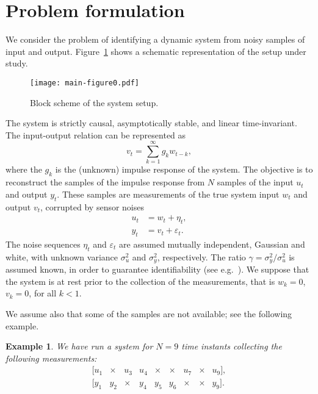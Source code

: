 \documentclass[10pt]{article}
\newtheorem{example}{Example}
\begin{document}
\section{Problem formulation}\label{sec:formulation}
We consider the problem of identifying a dynamic system
from noisy samples of input and output. Figure~\ref{fig:block_scheme} shows a
schematic representation of the setup under study.
\begin{figure}[htb]
  \centering
  \texttt{[image: main-figure0.pdf]}
  \caption{Block scheme of the system setup.}\label{fig:block_scheme}
\end{figure}
The system is strictly causal, asymptotically stable, and linear
time-invariant. The input-output relation can be represented as
\begin{equation}\label{eq:convolution}
  v_t = \sum_{k =1}^\infty g_k  w_{t-k},
\end{equation}
where the $g_k$ is the (unknown) impulse response
of the system. The objective is to reconstruct
the samples of the impulse response from $N$ samples of
the input $u_t$ and output $y_t$. These samples
are measurements of the true system input $w_t$ and output $v_t$, corrupted by
sensor noises
\begin{equation}\label{eq:measurements}
  \begin{split}
    u_t &= w_t + \eta_t,\\
    y_t &= v_t + \varepsilon_t.
  \end{split}
\end{equation}
The noise sequences $\eta_t$ and $\varepsilon_t$ are assumed mutually
independent, Gaussian and white, with unknown variance $\sigma_u^2$ and
$\sigma_y^2$, respectively. The ratio $\gamma=\sigma^2_y/\sigma^2_u$ is assumed
known, in order to guarantee identifiability (see
e.g.~\cite{fernando1985identification}). We suppose that the system is at rest
prior to the collection of the measurements, that is $w_k=0$, $v_k=0$, for all
$k<1$.

We assume also that some of the samples are not available; see the following
example.

\begin{example}
  We have run a system for $N=9$ time instants collecting the following measurements:
\begin{equation*}
  \renewcommand*{\arraystretch}{1.4}
  \begin{matrix}
  \big[ u_1 & \times & u_3 & u_4 & \times & \times & u_7 & \times & u_9\big],\\
  \big[ y_1 & y_2 & \times & y_4 & y_5 & y_6 & \times & \times & y_9\big].
  \end{matrix}
\end{equation*}
\end{example}
\end{document}
